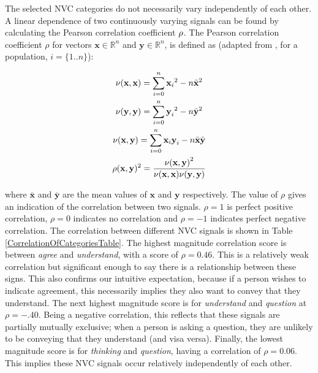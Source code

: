 The selected \ac{NVC} categories do not necessarily vary independently of each other. A linear dependence of two continuously varying signals can be found by calculating the Pearson correlation coefficient $\rho$. The Pearson correlation coefficient $\rho$ for vectors $\textbf{x} \in \mathbb{R}^{n}$ and $\textbf{y} \in \mathbb{R}^{n}$, is defined as (adapted from \cite{Weisstein2008}, for a population, $i=\{1..n\}$):

\begin{gather}
\nu(\textbf{x},\textbf{x}) = \displaystyle\sum\limits_{i=0}^n {\textbf{x}_i}^2 - n\bar{\textbf{x}}^2\\
\nu(\textbf{y},\textbf{y}) = \displaystyle\sum\limits_{i=0}^n {\textbf{y}_i}^2 - n\bar{\textbf{y}}^2\\
\nu(\textbf{x},\textbf{y}) = \displaystyle\sum\limits_{i=0}^n {\textbf{x}_i \textbf{y}_i} - n\bar{\textbf{x}}\bar{\textbf{y}}\\
\rho (\textbf{x},\textbf{y})^2 = \frac{{\nu(\textbf{x},\textbf{y})}^2}{\nu(\textbf{x},\textbf{x}) \nu(\textbf{y},\textbf{y})}
\label{EqnPearsonsCorrelation}
\end{gather}


where $\bar{\textbf{x}}$ and $\bar{\textbf{y}}$ are the mean values of $\textbf{x}$ and $\textbf{y}$ respectively. The value of $\rho$ gives an indication of the correlation between two signals. $\rho=1$ is perfect positive correlation, $\rho=0$ indicates no correlation and $\rho=-1$ indicates perfect negative correlation. The correlation between different \ac{NVC} signals is shown in Table \ref{CorrelationOfCategoriesTable}. The highest magnitude correlation score is between \textit{agree} and \textit{understand}, with a score of $\rho=0.46$. This is a relatively weak correlation but significant enough to say there is a relationship between these signs. This also confirms our intuitive expectation, because if a person wishes to indicate agreement, this necessarily implies they also want to convey that they understand. The next highest magnitude score is for \textit{understand} and \textit{question} at $\rho=-.40$. Being a negative correlation, this reflects that these signals are partially mutually exclusive; when a person is asking a question, they are unlikely to be conveying that they understand (and visa versa). Finally, the lowest magnitude score is for \textit{thinking} and \textit{question}, having a correlation of $\rho=0.06$. This implies these \ac{NVC} signals occur relatively independently of each other.

